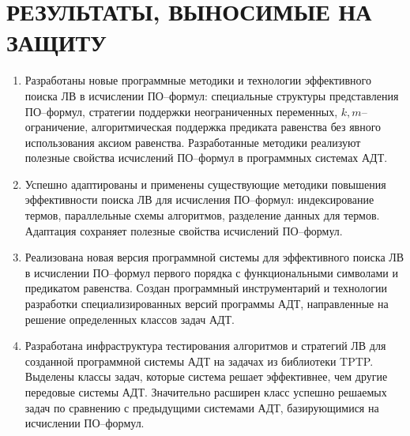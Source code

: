 \documentclass[a4paper]{report}
\begin{document}
\section*{РЕЗУЛЬТАТЫ, ВЫНОСИМЫЕ НА ЗАЩИТУ}
\begin{enumerate}
\item Разработаны новые программные методики и технологии эффективного поиска ЛВ в исчислении ПО--формул: специальные структуры представления ПО--формул, стратегии поддержки неограниченных переменных, $k,m$--огра\-ни\-че\-ние, алгоритмическая поддержка предиката равенства без явного использования аксиом равенства. Разработанные методики реализуют полезные свойства исчислений ПО--формул в программных системах АДТ.

\item Успешно адаптированы и применены существующие методики повышения эффективности поиска ЛВ для исчисления ПО--формул: индексирование термов, параллельные схемы алгоритмов, разделение данных для термов. Адаптация сохраняет полезные свойства исчислений ПО--формул.

\item Реализована новая версия программной системы для эффективного поиска ЛВ в исчислении ПО--формул первого порядка с функциональными символами и предикатом равенства. Создан программный инструментарий и технологии разработки специализированных версий программы АДТ, направленные на решение определенных классов задач АДТ. %

\item Разработана инфраструктура тестирования алгоритмов и стратегий ЛВ для созданной программной системы АДТ на задачах из библиотеки TPTP. Выделены классы задач, которые система решает эффективнее, чем другие передовые системы АДТ. Значительно расширен класс успешно решаемых задач по сравнению с предыдущими системами АДТ, базирующимися на исчислении ПО--формул.
\end{enumerate}



\end{document}
